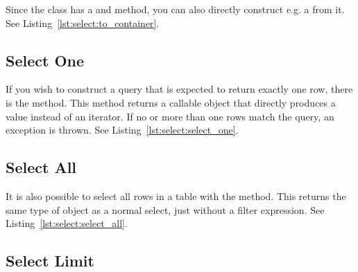 Since the  class has a  and  method, you can also directly construct e.g. a  from it. See Listing~\ref{lst:select:to_container}.



\subsection{Select One}
\label{section:select:one}

If you wish to construct a query that is expected to return exactly one row, there is the  method. This method returns a callable object that directly produces a value instead of an iterator. If no or more than one rows match the query, an exception is thrown. See Listing~\ref{lst:select:select_one}.



\subsection{Select All}
\label{section:select:all}

It is also possible to select all rows in a table with the  method. This returns the same type of object as a normal select, just without a filter expression. See Listing~\ref{lst:select:select_all}.



\subsection{Select Limit}
\label{section:select:limit}

